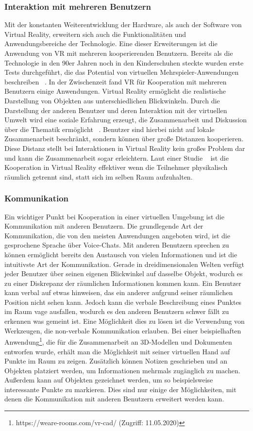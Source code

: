 \subsubsection{Interaktion mit mehreren Benutzern}
Mit der konstanten Weiterentwicklung der Hardware, als auch der Software von Virtual Reality, erweitern sich auch die Funktionalitäten und Anwendungsbereiche der Technologie. Eine dieser Erweiterungen ist die Anwendung von VR mit mehreren kooperierenden Benutzern. Bereits als die Technologie in den 90er Jahren noch in den Kinderschuhen steckte wurden erste Tests durchgeführt, die das Potential von virtuellen Mehrspieler-Anwendungen beschreiben ~\parencite{youngblut1998educational}.\newline
In der Zwischenzeit fand VR für Kooperation mit mehreren Benutzern einige Anwendungen. Virtual Reality ermöglicht die realistische Darstellung von Objekten aus unterschiedlichen Blickwinkeln. Durch die Darstellung der anderen Benutzer und deren Interaktion mit der virtuellen Umwelt wird eine soziale Erfahrung erzeugt, die Zusammenarbeit und Diskussion über die Thematik ermöglicht ~\parencite{8798289}. Benutzer sind hierbei nicht auf lokale Zusammenarbeit beschränkt, sondern können über große Distanzen kooperieren. Diese Distanz stellt bei Interaktionen in Virtual Reality kein großes Problem dar und kann die Zusammenarbeit sogar erleichtern. Laut einer Studie ~\parencite{8848001} ist die Kooperation in Virtual Reality effektiver wenn die Teilnehmer physikalisch räumlich getrennt sind, statt sich im selben Raum aufzuhalten. 

\subsubsection{Kommunikation}
Ein wichtiger Punkt bei Kooperation in einer virtuellen Umgebung ist die Kommunikation mit anderen Benutzern. Die grundlegende Art der Kommunikation, die von den meisten Anwendungen angeboten wird, ist die gesprochene Sprache über Voice-Chats. Mit anderen Benutzern sprechen zu können ermöglicht bereits den Austausch von vielen Informationen und ist die intuitivste Art der Kommunikation. Gerade in dreidimensionalen Welten verfügt jeder Benutzer über seinen eigenen Blickwinkel auf dasselbe Objekt, wodurch es zu einer Diskrepanz der räumlichen Informationen kommen kann. Ein Benutzer kann verbal auf etwas hinweisen, das ein anderer aufgrund seiner räumlichen Position nicht sehen kann. Jedoch kann die verbale Beschreibung eines Punktes im Raum vage ausfallen, wodurch es den anderen Benutzern schwer fällt zu erkennen was gemeint ist. Eine Möglichkeit dies zu lösen ist die Verwendung von Werkzeugen, die non-verbale Kommunikation erlauben. Bei einer beispielhaften Anwendung\footnote{https://weare-rooms.com/vr-cad/ (Zugriff: 11.05.2020)}, die für die Zusammenarbeit an 3D-Modellen und Dokumenten entworfen wurde, erhält man die Möglichkeit mit seiner virtuellen Hand auf Punkte im Raum zu zeigen. Zusätzlich können Notizen geschrieben und an Objekten platziert werden, um Informationen mehrmals zugänglich zu machen. Außerdem kann auf Objekten gezeichnet werden, um so beispielsweise interessante Punkte zu markieren. Dies sind nur einige der Möglichkeiten, mit denen die Kommunikation mit anderen Benutzern erweitert werden kann.

